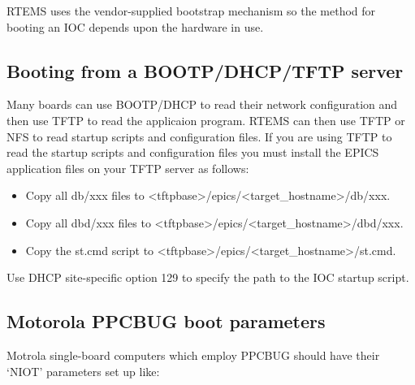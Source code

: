 RTEMS uses the vendor-supplied bootstrap mechanism so the method for booting an IOC depends upon the hardware in 
use.

\subsection{Booting from a BOOTP/DHCP/TFTP server}

Many boards can use BOOTP/DHCP to read their network configuration and then use TFTP to read the applicaion 
program.  RTEMS can then use TFTP or NFS to read startup scripts and configuration files. If you are using TFTP to read 
the startup scripts and configuration files you must install the EPICS application files on your TFTP server as follows:

\begin{itemize}\item Copy all db/xxx files to \textless{}tftpbase\textgreater{}/epics/\textless{}target\_hostname\textgreater{}/db/xxx.

\item Copy all dbd/xxx files to \textless{}tftpbase\textgreater{}/epics/\textless{}target\_hostname\textgreater{}/dbd/xxx.

\item Copy the st.cmd script  to \textless{}tftpbase\textgreater{}/epics/\textless{}target\_hostname\textgreater{}/st.cmd.

\end{itemize}Use DHCP site-specific option 129 to specify the path to the IOC startup script.

\subsection{Motorola PPCBUG boot parameters}

Motrola single-board computers which employ PPCBUG should have their `NIOT' parameters set up like:

